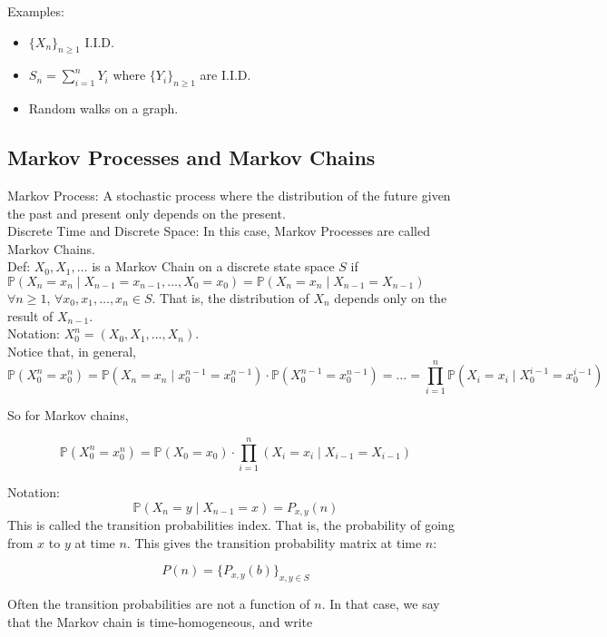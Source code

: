 \documentclass[english, 11pt]{article}
\begin{document}
Examples:

\begin{itemize}
	\item $\{X_n\}_{n \geq 1}$ I.I.D.
	\item $S_n = \sum_{i = 1}^n Y_i$ where $\{Y_i\}_{n \geq 1}$ are I.I.D.
	\item Random walks on a graph.
\end{itemize}

\subsection{Markov Processes and Markov Chains}

Markov Process: A stochastic process where the distribution of the future given the past and present only depends on the present.\\

Discrete Time and Discrete Space: In this case, Markov Processes are called Markov Chains.\\

Def: $X_0, X_1, \dots$ is a Markov Chain on a discrete state space $S$ if $\mathbb{P}(X_n = x_n \mid X_{n-1} = x_{n-1}, \dots, X_0 = x_0) = \mathbb{P}(X_n = x_n \mid X_{n-1} = X_{n-1})$ $\forall n \geq 1$, $\forall x_0, x_1, \dots, x_n \in S$. That is, the distribution of $X_n$ depends only on the result of $X_{n-1}$.\\

Notation: $X_0^n = (X_0, X_1, \dots, X_n)$.\\

Notice that, in general,
\[\mathbb{P}(X_0^n = x_0^n) = \mathbb{P}(X_n = x_n \mid x_0^{n-1} = x_0^{n-1}) \cdot \mathbb{P}(X_0^{n-1} = x_0^{n-1}) = \dots = \prod_{i=1}^{n} \mathbb{P}(X_i = x_i \mid X_0^{i-1} = x_0^{i-1})\]

So for Markov chains,

\[\mathbb{P}(X_0^n = x_0^n) = \mathbb{P}(X_0 = x_0) \cdot \prod_{i=1}^{n}(X_i = x_i \mid X_{i-1} = X_{i-1})\]

Notation:
\[\mathbb{P}(X_n = y \mid X_{n-1} = x) = P_{x,y}(n)\]
This is called the transition probabilities index. That is, the probability of going from $x$ to $y$ at time $n$. This gives the transition probability matrix at time $n$:

\[P(n) = \{P_{x, y}(b)\}_{x, y \in S}\]

Often the transition probabilities are not a function of $n$. In that case, we say that the Markov chain is time-homogeneous, and write
\end{document}
